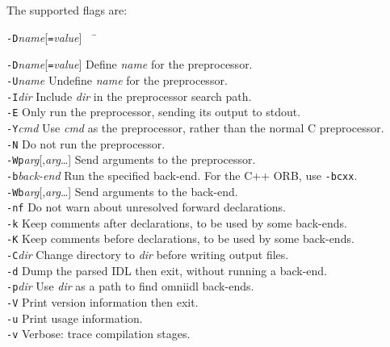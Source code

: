 \documentclass[11pt,twoside,a4paper]{article}
\newcommand{\cmdline}[1]{\texttt{#1}}
\begin{document}
The supported flags are:

\begin{tabbing}
\cmdline{-D}\textit{name}[\cmdline{=}\textit{value}]~~ \= \kill

\cmdline{-D}\textit{name}[\cmdline{=}\textit{value}]
     \> Define \textit{name} for the preprocessor.\\

\cmdline{-U}\textit{name}
     \> Undefine \textit{name} for the preprocessor.\\

\cmdline{-I}\textit{dir}
     \> Include \textit{dir} in the preprocessor search path.\\

\cmdline{-E}
     \> Only run the preprocessor, sending its output to stdout.\\

\cmdline{-Y}\textit{cmd}
     \> Use \textit{cmd} as the preprocessor, rather than the normal C
        preprocessor.\\

\cmdline{-N}
     \> Do not run the preprocessor.\\

\cmdline{-Wp}\textit{arg}[,\textit{arg}\dots]
     \> Send arguments to the preprocessor.\\

\cmdline{-b}\textit{back-end}
     \> Run the specified back-end. For the C++ ORB, use \cmdline{-bcxx}.\\

\cmdline{-Wb}\textit{arg}[,\textit{arg}\dots]
     \> Send arguments to the back-end.\\

\cmdline{-nf}
     \> Do not warn about unresolved forward declarations.\\

\cmdline{-k}
     \> Keep comments after declarations, to be used by some back-ends.\\

\cmdline{-K}
     \> Keep comments before declarations, to be used by some back-ends.\\

\cmdline{-C}\textit{dir}
     \> Change directory to \textit{dir} before writing output files.\\

\cmdline{-d}
     \> Dump the parsed IDL then exit, without running a back-end.\\

\cmdline{-p}\textit{dir}
     \> Use \textit{dir} as a path to find omniidl back-ends.\\

\cmdline{-V}
     \> Print version information then exit.\\

\cmdline{-u}
     \> Print usage information.\\

\cmdline{-v}
     \> Verbose: trace compilation stages.\\

\end{tabbing}
\end{document}
